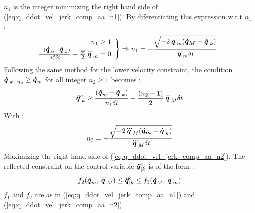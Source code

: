 \documentclass[a4paper, 10pt, conference]{ieeeconf}      %
\newcommand{\vect}[1]{\mbox{\boldmath${#1}$}}%
\begin{document}
$n_1$ is the integer minimizing the right hand side of (\ref{eq:q_ddot_vel_jerk_comp_aa_n1}). By diferentiating this expression w.r.t $n_1$ :
\begin{equation} 
\hspace{-4mm}
\left. \begin{array}{r} 
n_1 \geq 1 \\
\frac{-(\vect{\dot{q}}_M-\vect{\dot{q}}_{|k})}{n_1^2 \delta t} - \frac{\delta t}{2} \vect{\dddot{q}}_m  = 0
\end{array} \right\} 
\Rightarrow n_1=-\frac{\sqrt{-2\vect{\dddot{q}}_m(\vect{\dot{q}_M}-\vect{\dot{q}}_{|k})}}{\vect{\dddot{q}}_m \delta t}
\label{eq:n_1_eq_aa}
\end{equation}
Following the same method for the lower velocity constraint, the condition $\vect{\dot{q}}_{|k+n_2} \geq \vect{\dot{q}}_{m}$ for all integer $n_2 \geq 1$ becomes : 
\begin{equation}
\begin{split}
\vect{\ddot{q}}_{|k}^{c} \geq \frac{(\vect{\dot{q}}_m-\vect{\dot{q}}_{|k})}{n_1 \delta t} - \frac{(n_2-1)}{2} \vect{\dddot{q}}_M \delta t
\label{eq:q_ddot_vel_jerk_comp_aa_n2}
\end{split}
\end{equation}
With :
\begin{equation}
n_2 = -\frac{\sqrt{-2\vect{\dddot{q}}_M(\vect{\dot{q}_m}-\vect{\dot{q}}_{|k})}}{\vect{\dddot{q}}_M \delta t} 
\label{eq:n_2_eq_aa}
\end{equation}
Maximizing the right hand side of (\ref{eq:q_ddot_vel_jerk_comp_aa_n2}).
The reflected constraint on the control variable $\vect{\ddot{q}}_{|k}^{c}$ is of the form : 
\begin{equation}
\begin{split}
f_2(\vect{\dot{q}}_m, \vect{\dddot{q}}_M) \leq \vect{\ddot{q}}_{|k}^{c} \leq f_1(\vect{\dot{q}}_M, \vect{\dddot{q}}_m) 
\label{eq:qddot_cond_to_satisfy_Jerk_Vel_compatibility_profile}
\end{split}
\end{equation}
$f_1$ and $f_2$ are as in (\ref{eq:q_ddot_vel_jerk_comp_aa_n1}) and (\ref{eq:q_ddot_vel_jerk_comp_aa_n2}).
\end{document}
